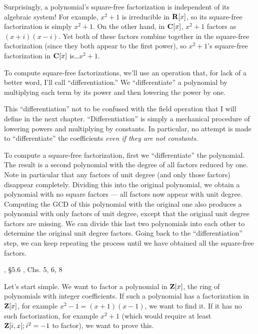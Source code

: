 Surprisingly, a polynomial's square-free factorization is independent
of its algebraic system!  For example, $x^2+1$ is irreducible in ${\bf
R}[x]$, so its square-free factorization is simply $x^2+1$.  On the
other hand, in ${\bf C}[x]$, $x^2+1$ factors as $(x+i)(x-i)$.  Yet
both of these factors combine together in the square-free
factorization (since they both appear to the first power), so
$x^2+1$'s square-free factorization in ${\bf C}[x]$ is\ldots $x^2+1$.

To compute square-free factorizations, we'll use an operation that,
for lack of a better word, I'll call ``differentiation.''  We
``differentiate'' a polynomial by multiplying each term by its power
and then lowering the power by one.

This ``differentiation'' not to be confused with the field operation
that I will define in the next chapter.  ``Differentiation'' is simply
a mechanical procedure of lowering powers and multiplying by
constants.  In particular, no attempt is made to ``differentiate''
the coefficients {\it even if they are not constants}.

To compute a square-free factorization, first we ``differentiate'' the
polynomial.  The result is a second polynomial with the degree of all
factors reduced by one.  Note in particular that any factors of unit
degree (and only those factors) disappear completely.  Dividing this
into the original polynomial, we obtain a polynomial with no square
factors --- all factors now appear with unit degree.  Computing the
GCD of this polynomial with the original one also produces a
polynomial with only factors of unit degree, except that the original
unit degree factors are missing.  We can divide this last two
polynomials into each other to determine the original unit degree
factors.  Going back to the ``differentiation'' step, we can keep
repeating the process until we have obtained all the square-free
factors.



, \S5.6
\hbox{}\qquad [Geddes], Chs. 5, 6, 8

Let's start simple.  We want to factor a polynomial in ${\bf Z}[x]$,
the ring of polynomials with integer coefficients.  If such a
polynomial has a factorization in ${\bf Z}[x]$, for example
$x^2-1=(x+1)(x-1)$, we want to find it.  If it has no such
factorization, for example $x^2+1$ (which would require at least ${\bf
Z}[i,x]; i^2=-1$ to factor), we want to prove this.

